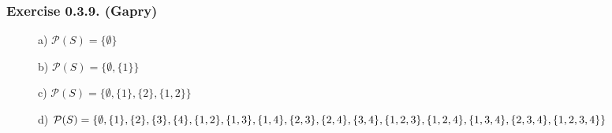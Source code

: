 \subsubsection*{Exercise 0.3.9. (Gapry)}

\begin{description}
\item[] a) $\mathcal{P}(S) = \{ \emptyset \}$
\item[] b) $\mathcal{P}(S) = \{ \emptyset, \{1\} \}$
\item[] c) $\mathcal{P}(S) = \{ \emptyset, \{1\}, \{2\}, \{1, 2\} \}$
\item[] d) $\mathcal{P}(S) = \{          
  \emptyset,                             \\
  \{1\}, \{2\}, \{3\}, \{4\},            \\
  \{1, 2\}, \{1, 3\}, \{1, 4\},          \\
  \{2, 3\}, \{2, 4\},                    \\
  \{3, 4\},                              \\
  \{1, 2, 3\}, \{1, 2, 4\}, \{1, 3, 4\}, \\ 
  \{2, 3, 4\},                           \\
  \{1, 2, 3, 4\}\}$
\end{description}
